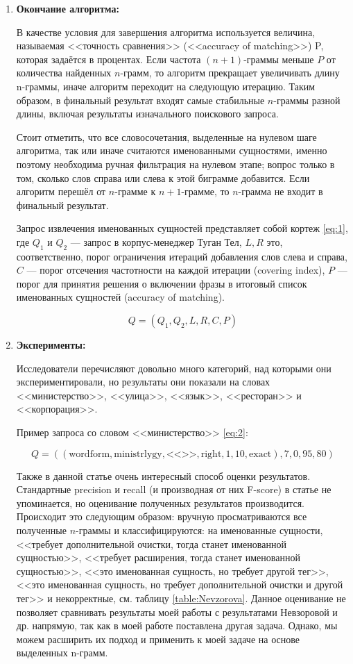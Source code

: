 \begin{enumerate}
\item\textbf{Окончание алгоритма:}

В качестве условия для завершения алгоритма используется величина, называемая <<точность сравнения>> (<<accuracy of matching>>) P, которая задаётся в процентах. Если частота $(n+1)$-граммы меньше $P$ от количества найденных $n$-грамм, то алгоритм прекращает увеличивать длину n-граммы, иначе алгоритм переходит на следующую итерацию. Таким образом, в финальный результат входят самые стабильные $n$-граммы разной длины, включая результаты изначального поискового запроса.

Стоит отметить, что все словосочетания, выделенные на нулевом шаге алгоритма, так или иначе считаются именованными сущностями, именно поэтому необходима ручная фильтрация на нулевом этапе; вопрос только в том, сколько слов справа или слева к этой биграмме добавится. Если алгоритм перешёл от $n$-грамме к $n+1$-грамме, то $n$-грамма не входит в финальный результат.

Запрос извлечения именованных сущностей представляет собой кортеж \eqref{eq:1}, где $Q_1$ и $Q_2$ --- запрос в корпус-менеджер Туган Тел\cite{tugan_tel}, $L, R$ это, соответственно, порог ограничения итераций добавления слов слева и справа, $C$ --- порог отсечения частотности на каждой итерации (covering index), $P$ --- порог для принятия решения о включении фразы в итоговый список именованных сущностей (accuracy of matching).

\begin{equation}
Q = (Q_1, Q_2, L, R, C, P) \label{eq:1}
\end{equation}

\item\textbf{Эксперименты:}

Исследователи перечисляют довольно много категорий, над которыми они экспериментировали, но результаты они показали на словах <<министерство>>, <<улица>>, <<язык>>, <<ресторан>> и <<корпорация>>.

Пример запроса со словом <<министерство>> \eqref{eq:2}:

\begin{equation}
Q = ((\text{wordform}, \text{ministrlygy}, \text{<<>>}, \text{right}, 1, 10, \text{exact}), 7, 0, 95, 80)  \label{eq:2}
\end{equation}

Также в данной статье очень интересный способ оценки результатов. Стандартные precision и recall (и производная от них F-score) в статье не упоминается, но оценивание полученных результатов производится. Происходит это следующим образом: вручную просматриваются все полученные $n$-граммы и классифицируются: на именованные сущности, <<требует дополнительной очистки, тогда станет именованной сущностью>>, <<требует расширения, тогда станет именованной сущностью>>, <<это именованная сущность, но требует другой тег>>,  <<это именованная сущность, но требует дополнительной очистки и другой тег>> и некорректные, см. таблицу \ref{table:Nevzorova}. Данное оценивание не позволяет сравнивать результаты моей работы с результатами Невзоровой и др. напрямую, так как в моей работе поставлена другая задача. Однако, мы можем расширить их подход и применить к моей задаче на основе выделенных n-грамм.


\end{enumerate}
